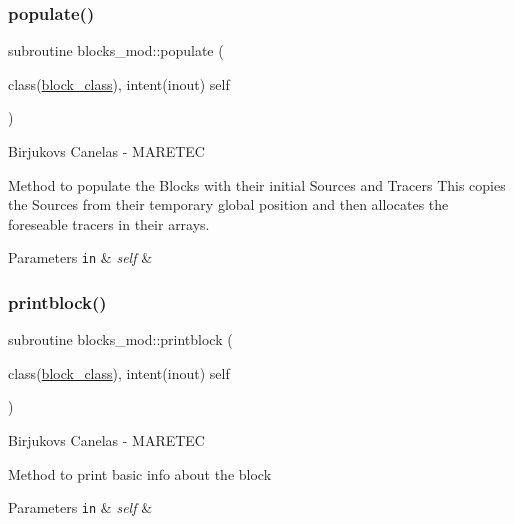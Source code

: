 \subsubsection{\texorpdfstring{populate()}{populate()}}
{\footnotesize\ttfamily subroutine blocks\+\_\+mod\+::populate (\begin{DoxyParamCaption}\item[{class(\hyperlink{structblocks__mod_1_1block__class}{block\+\_\+class}), intent(inout)}]{self }\end{DoxyParamCaption})\hspace{0.3cm}{\ttfamily [private]}}



Birjukovs Canelas -\/ M\+A\+R\+E\+T\+EC 

Method to populate the Blocks with their initial Sources and Tracers This copies the Sources from their temporary global position and then allocates the foreseable tracers in their arrays. 
\begin{DoxyParams}[1]{Parameters}
\mbox{\tt in}  & {\em self} & \\
\hline
\end{DoxyParams}
\mbox{\label{namespaceblocks__mod_a6eab8b323cb15dcecb5c6b0c31b4e246}} 
\subsubsection{\texorpdfstring{printblock()}{printblock()}}
{\footnotesize\ttfamily subroutine blocks\+\_\+mod\+::printblock (\begin{DoxyParamCaption}\item[{class(\hyperlink{structblocks__mod_1_1block__class}{block\+\_\+class}), intent(inout)}]{self }\end{DoxyParamCaption})\hspace{0.3cm}{\ttfamily [private]}}



Birjukovs Canelas -\/ M\+A\+R\+E\+T\+EC 

Method to print basic info about the block 
\begin{DoxyParams}[1]{Parameters}
\mbox{\tt in}  & {\em self} & \\
\hline
\end{DoxyParams}
\mbox{\label{namespaceblocks__mod_a3312d23e0268d67aaf99d579aa57d0e7}} 
